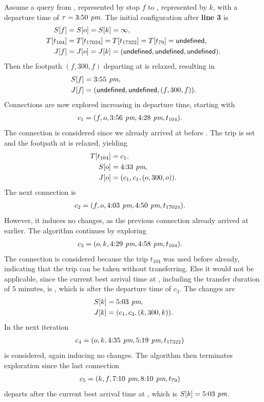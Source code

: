 	Assume a query from \freiburg, represented by stop $f$ to \karlsruhe, represented by $k$, with a departure time of
	$\tau = 3\text{:}50\textit{ pm}$. The initial configuration after \textbf{line 3} is
	\begin{align*}
		S[f]		&= S[o] = S[k] = \infty,\\
		T[t_{104}]	&= T[t_{17024}] = T[t_{17322}] = T[t_{79}] = \textsf{undefined},\\
		J[f]		&= J[o] = J[k] = (\textsf{undefined}, \textsf{undefined}, \textsf{undefined}).
	\end{align*}
	Then the footpath $(f, 300, f)$ departing at \freiburg is relaxed, resulting in
	\begin{align*}
		S[f]	&= 3\text{:}55\textit{ pm},\\
		J[f]	&= (\textsf{undefined}, \textsf{undefined}, (f, 300, f)).
	\end{align*}
	Connections are now explored increasing in departure time, starting with
	\begin{align*}
		c_1	&= (f, o, 3\text{:}56\textit{ pm}, 4\text{:}28\textit{ pm}, t_{104}).
	\end{align*}
	The connection is considered since we already arrived at \freiburg before . The trip is set and the
	footpath at \offenburg is relaxed, yielding
	\begin{align*}
		T[t_{104}]	&= c_1,\\
		S[o]		&= 4\text{:}33\textit{ pm},\\
		J[o]		&= (c_1, c_1, (o, 300, o)).
	\end{align*}
	The next connection is
	\begin{align*}
		c_2	&= (f, o, 4\text{:}03\textit{ pm}, 4\text{:}50\textit{ pm}, t_{17024}).
	\end{align*}
	However, it induces no changes, as the previous connection already arrived at \offenburg earlier.
	The algorithm continues by exploring
	\begin{align*}
		c_3	&= (o, k, 4\text{:}29\textit{ pm}, 4\text{:}58\textit{ pm}, t_{104}).
	\end{align*}
	The connection is considered because the trip $t_{104}$ was used before already, indicating that the trip can be taken without transferring.
	Else it would not be applicable, since the current best arrival time at \offenburg, including the transfer duration of $5$ minutes,
	is , which is after the departure time of $c_3$. The changes are
	\begin{align*}
		S[k]		&= 5\text{:}03\textit{ pm},\\
		J[k]		&= (c_1, c_3, (k, 300, k)).
	\end{align*}
	In the next iteration
	\begin{align*}
		c_4	&= (o, k, 4\text{:}35\textit{ pm}, 5\text{:}19\textit{ pm}, t_{17322})
	\end{align*}
	is considered, again inducing no changes. The algorithm then terminates exploration since the last connection
	\begin{align*}
		c_5	&= (k, f, 7\text{:}10\textit{ pm}, 8\text{:}10\textit{ pm}, t_{79})
	\end{align*}
	departs after the current best arrival time at \karlsruhe, which is $S[k] = 5\text{:}03\textit{ pm}$.
	
